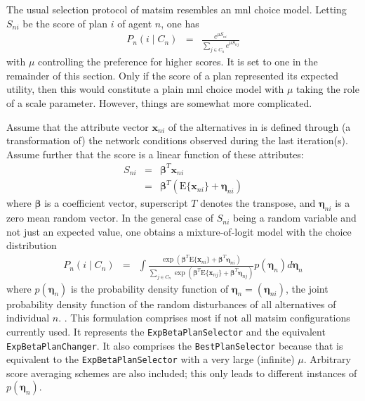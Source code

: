 The usual selection protocol of \gls{matsim} resembles an \gls{mnl}
choice model. Letting $S_{ni}$ be the score of plan $i$ of agent
$n$, one has
\begin{eqnarray}
P_{n}(i\mid C_{n}) & = & \frac{e^{\mu S_{ni}}}{\sum_{j\in C_{n}}e^{\mu S_{nj}}}\label{eq:ExpBetaPlanSelector}
\end{eqnarray}
with $\mu$ controlling the preference for higher scores.
It is set to one in the remainder of this section. Only if the score
of a plan represented its expected utility, then this would constitute
a plain \gls{mnl} choice model with $\mu$ taking the role
of a scale parameter. However, things are somewhat more complicated.

Assume that the attribute vector $\mathbf{x}_{ni}$ of the alternatives in 
is defined through (a transformation of) the network conditions observed
during the last iteration(s). Assume further that the score is a linear
function of these attributes:
\begin{eqnarray}
S_{ni} & = & \boldsymbol{\beta}^{T}\mathbf{x}_{ni}\\
 & = & \boldsymbol{\beta}^{T}(\text{E}\{\mathbf{x}_{ni}\}+\boldsymbol{\eta}_{ni})\label{eq:score}
\end{eqnarray}
where $\boldsymbol{\beta}$ is a coefficient vector, superscript $T$ denotes the transpose,
and $\boldsymbol{\eta}_{ni}$ is a zero mean random vector. 
In the general case of $S_{ni}$ being a random
variable and not just an expected value, one obtains a mixture-of-logit
model with the choice distribution
\begin{eqnarray}
P_{n}(i\mid C_{n}) & = & 
\int\frac{\exp\left(\boldsymbol{\beta}^{T}\text{E}\{\mathbf{x}_{ni}\}+\boldsymbol{\beta}^{T}\boldsymbol{\eta}_{ni}\right)}
{\sum_{j\in C_{n}}\exp\left(\boldsymbol{\beta}^{T}\text{E}\{\mathbf{x}_{nj}\}+\boldsymbol{\beta}^{T}\boldsymbol{\eta}_{nj}\right)}
p(\boldsymbol{\eta}_{n})d\boldsymbol{\eta}_{n}\label{eq:mixture-of-logit}
\end{eqnarray}
where $p(\boldsymbol{\eta}_{n})$ is the probability density function of 
$\boldsymbol{\eta}_{n}=(\boldsymbol{\eta}_{ni})$, \ie the joint probability
density function of the random disturbances of all alternatives of individual $n$.
\citep{train-2003}. This formulation comprises most if not all \gls{matsim}
configurations currently used. It represents the \lstinline{ExpBetaPlanSelector}
and the equivalent \lstinline{ExpBetaPlanChanger}. It also comprises
the \lstinline{BestPlanSelector} because that is equivalent to the \lstinline{ExpBetaPlanSelector}
with a very large (infinite) $\mu$. Arbitrary score averaging schemes
are also included; this only leads to different instances of $p(\boldsymbol{\eta}_{n})$.

